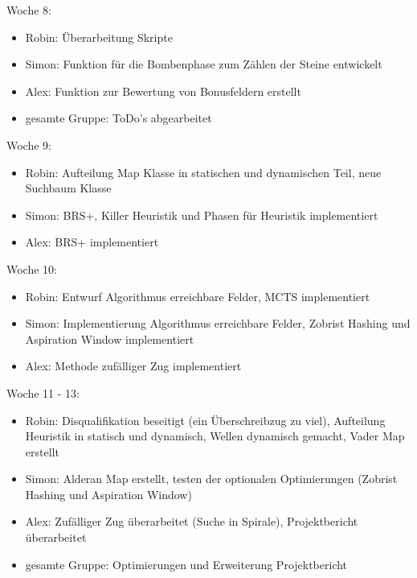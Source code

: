 \documentclass[12pt,a4paper,bibliography=totocnumbered,listof=totocnumbered]{article}
\begin{document}
Woche 8:
\begin{itemize}
\item Robin: Überarbeitung Skripte
\item Simon: Funktion für die Bombenphase zum Zählen der Steine entwickelt
\item Alex: Funktion zur Bewertung von Bonusfeldern erstellt
\item gesamte Gruppe: ToDo's abgearbeitet
\end{itemize}
Woche 9:
\begin{itemize}
\item Robin: Aufteilung Map Klasse in statischen und dynamischen Teil, neue Suchbaum Klasse
\item Simon: BRS+, Killer Heuristik und Phasen für Heuristik implementiert
\item Alex: BRS+ implementiert
\end{itemize}
Woche 10:
\begin{itemize}
\item Robin: Entwurf Algorithmus erreichbare Felder, MCTS implementiert
\item Simon: Implementierung Algorithmus erreichbare Felder, Zobrist Hashing und Aspiration Window implementiert
\item Alex: Methode zufälliger Zug implementiert
\end{itemize}
Woche 11 - 13:
\begin{itemize}
\item Robin: Disqualifikation beseitigt (ein Überschreibzug zu viel), Aufteilung Heuristik in statisch und dynamisch, Wellen dynamisch gemacht, Vader Map erstellt
\item Simon: Alderan Map erstellt, testen der optionalen Optimierungen (Zobrist Hashing und Aspiration Window)
\item Alex: Zufälliger Zug überarbeitet (Suche in Spirale), Projektbericht überarbeitet
\item gesamte Gruppe: Optimierungen und Erweiterung Projektbericht
\end{itemize}

\newpage
\end{document}
